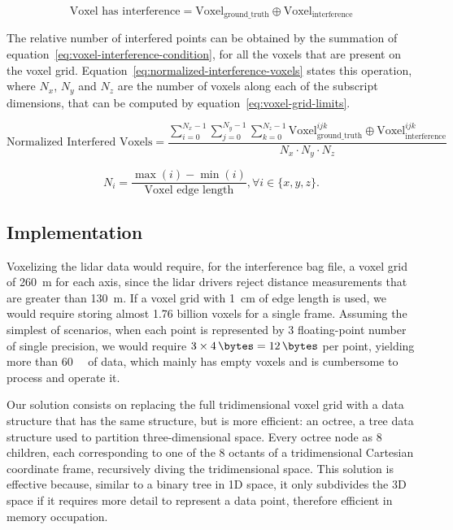 \begin{equation}
		\label{eq:voxel-interference-condition}
		\text{Voxel has interference} = \text{Voxel}_\text{ground\_truth} \oplus  \text{Voxel}_\text{interference} 
\end{equation}

The relative number of interfered points can be obtained by the summation of equation~\ref{eq:voxel-interference-condition}, for all the voxels that are present on the voxel grid. Equation~\ref{eq:normalized-interference-voxels} states this operation, where $N_x$, $N_y$ and $N_z$ are the number of voxels along each of the subscript dimensions, that can be computed by equation~\ref{eq:voxel-grid-limits}.

\begin{equation}
	\label{eq:normalized-interference-voxels}
	\text{Normalized Interfered Voxels} =\displaystyle \frac{\sum\limits^{N_x - 1}_{i = 0} \sum\limits^{N_y - 1}_{j = 0} \sum\limits^{N_z - 1}_{k = 0} \text{Voxel}_\text{ground\_truth}^{ijk} \oplus  \text{Voxel}_\text{interference}^{ijk}}{N_x\cdot N_y\cdot N_z}
\end{equation}

\begin{equation}
	\label{eq:voxel-grid-limits}
	N_i = \frac{\max(i) - \min(i)}{\text{Voxel edge length}}, \forall i \in \{x, y, z\}.
\end{equation}

\subsection{Implementation}
Voxelizing the \ac{lidar} data would require, for the interference bag file, a voxel grid of \SI{260}{\meter} for each axis, since the \ac{lidar} drivers reject distance measurements that are greater than \SI{130}{\meter}. If a voxel grid with \SI{1}{\centi\meter} of edge length is used, we would require storing almost 1.76 billion voxels for a single frame. Assuming the simplest of scenarios, when each point is represented by 3 floating-point number of single precision, we would require $3\times \SI{4}{\bytes} = \SI{12}{\bytes}$ per point, yielding more than \SI{60}{\giga\byte} of data, which mainly has empty voxels and is cumbersome to process and operate it.

Our solution consists on replacing the full tridimensional voxel grid with a data structure that has the same structure, but is more efficient: an octree, a tree data structure used to partition three-dimensional space. Every octree node as 8 children, each corresponding to one of the 8 octants of a tridimensional Cartesian coordinate frame, recursively diving the tridimensional space. This solution is effective because, similar to a binary tree in 1D space, it only subdivides the 3D space if it requires more detail to represent a data point, therefore efficient in memory occupation.

